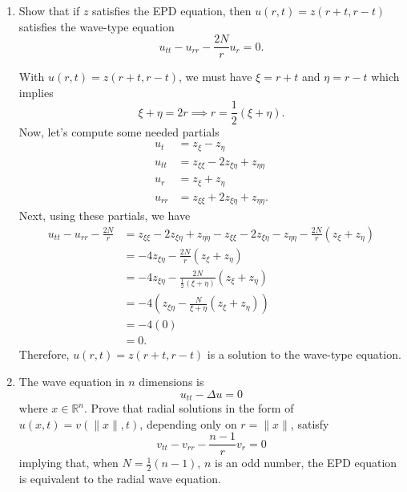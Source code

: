 \documentclass[a4paper,12pt]{article}
\newcommand{\reals}{\mathbb{R}}
\newcommand{\norm}[1]{\lVert #1 \rVert}
\begin{document}
\begin{enumerate}[label = \arabic*.]
\begin{enumerate}[label = (\alph*)]
		\item Show that if $ z $ satisfies the EPD equation, then $ u(r, t) = z(r + t, r - t) $ satisfies the wave-type equation
		\[
			u_{tt} - u_{rr} - \frac{2N}{r} u_r = 0.
		\]
		
		With $ u(r, t) = z(r + t, r - t) $, we must have $ \xi = r + t $ and $ \eta = r - t $ which implies
		\[
			\xi + \eta = 2r \implies r = \frac{1}{2}(\xi + \eta).
		\]
		Now, let's compute some needed partials
		\begin{align*}
			u_t &= z_\xi - z_\eta \\
			u_{tt} &= z_{\xi\xi} - 2 z_{\xi \eta} + z_{\eta \eta} \\
			u_r &= z_\xi + z_\eta \\
			u_{rr} &= z_{\xi\xi} + 2 z_{\xi \eta} + z_{\eta \eta}.
		\end{align*}
		Next, using these partials, we have
		\begin{align*}
			u_{tt} - u_{rr} - \frac{2N}{r} &= z_{\xi\xi} - 2 z_{\xi \eta} + z_{\eta \eta} - z_{\xi\xi} - 2 z_{\xi \eta} - z_{\eta \eta} - \frac{2N}{r} (z_\xi + z_\eta) \\
			&= -4 z_{\xi \eta} - \frac{2N}{r}(z_\xi + z_\eta) \\
			&= -4 z_{\xi \eta} - \frac{2N}{\frac{1}{2}(\xi + \eta)}(z_\xi + z_\eta) \\
			&= -4 \left(z_{\xi \eta} - \frac{N}{\xi + \eta}(z_\xi + z_\eta)\right) \\
			&= -4 (0) \\
			&= 0.
		\end{align*}
		Therefore, $ u(r,t) = z(r+t, r-t) $ is a solution to the wave-type equation.
		
		\item The wave equation in $ n $ dimensions is
		\[
			u_{tt} - \Delta u = 0
		\]
		where $ x \in \reals^n $. Prove that radial solutions in the form of $ u(x, t) = v(\norm{x}, t) $, depending only on $ r = \norm{x} $, satisfy
		\[
			v_{tt} - v_{rr} - \frac{n - 1}{r}v_r = 0
		\]
		implying that, when $ N = \frac{1}{2}(n - 1) $, $ n $ is an odd number, the EPD equation is equivalent to the radial wave equation.
		

\end{enumerate}
\end{enumerate}
\end{document}
